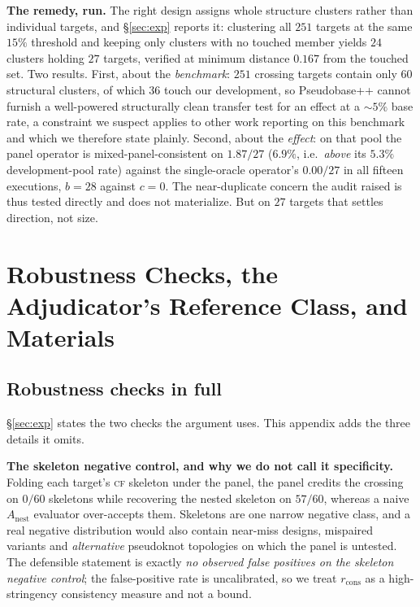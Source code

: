 \documentclass[11pt]{article}
\newcommand{\CF}{\textsc{cf}}
\begin{document}
\smallskip\noindent\textbf{The remedy, run.} The right design assigns whole structure clusters rather than
individual targets, and \S\ref{sec:exp} reports it: clustering all $251$ targets at the
same $15\%$ threshold and keeping only clusters with no touched member yields $24$ clusters holding $27$
targets, verified at minimum distance $0.167$ from the touched set. Two results. First, about the
\emph{benchmark}: $251$ crossing targets contain only $60$ structural clusters, of which $36$ touch our
development, so Pseudobase++ cannot furnish a well-powered structurally clean transfer test for an effect at a
$\sim\!5\%$ base rate, a constraint we suspect applies to other work reporting on this benchmark and which we
therefore state plainly. Second, about the \emph{effect}: on that pool the panel operator is
mixed-panel-consistent on $1.87/27$ ($6.9\%$, i.e.\ \emph{above} its $5.3\%$ development-pool rate) against the
single-oracle operator's $0.00/27$ in all fifteen executions, $b{=}28$ against $c{=}0$. The near-duplicate concern the audit
raised is thus tested directly and does not materialize. But on $27$ targets that settles direction, not size.

\section{Robustness Checks, the Adjudicator's Reference Class, and Materials}\label{app:support}

\subsection{Robustness checks in full}\label{app:robust}
\S\ref{sec:exp} states the two checks the argument uses. This appendix adds the three details it omits.

\smallskip\noindent\textbf{The skeleton negative control, and why we do not call it specificity.} Folding each
target's \CF{} skeleton under the panel, the panel credits the crossing on $0/60$ skeletons while recovering the
nested skeleton on $57/60$, whereas a naive $A_{\mathrm{nest}}$ evaluator over-accepts them. Skeletons are one
narrow negative class, and a real negative distribution would also contain near-miss designs, mispaired
variants and \emph{alternative} pseudoknot topologies on which the panel is untested. The defensible statement
is exactly \emph{no observed false positives on the skeleton negative control}; the false-positive rate is uncalibrated, so we treat $r_{\mathrm{cons}}$ as a high-stringency consistency measure and not a bound.
\end{document}
